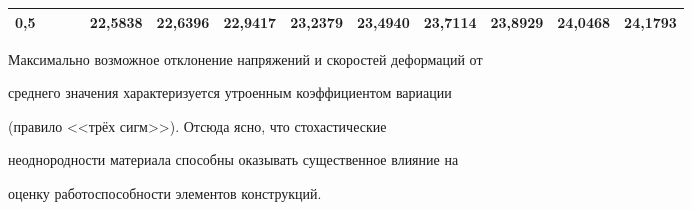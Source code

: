 \begin{table}[t!]
\begin{minipage}[b!]{170mm}
\begin{tabular}{r|r|r|r|r|r|r|r|r|r}
0,5~~~~~&22,5838&22,6396&22,9417&23,2379&23,4940&23,7114&23,8929&24,0468&24,1793\\%



\hline%

\end{tabular}

\label{Zabelin:tab:02}

\end{minipage}

\renewcommand{\bfdefault}{bx}

\end{table}



Максимально возможное отклонение напряжений и скоростей деформаций от

среднего значения характеризуется утроенным коэффициентом вариации

(правило <<трёх сигм>>). Отсюда ясно, что стохастические

неоднородности материала способны оказывать существенное влияние на

оценку работоспособности элементов конструкций.







